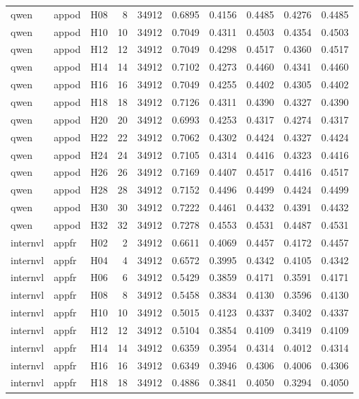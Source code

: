 \begin{table}[tbp]
\begin{tabular}{lllrrrrrrr}
qwen & appod & H08 & 8 & 34912 & 0.6895 & 0.4156 & 0.4485 & 0.4276 & 0.4485 \\
qwen & appod & H10 & 10 & 34912 & 0.7049 & 0.4311 & 0.4503 & 0.4354 & 0.4503 \\
qwen & appod & H12 & 12 & 34912 & 0.7049 & 0.4298 & 0.4517 & 0.4360 & 0.4517 \\
qwen & appod & H14 & 14 & 34912 & 0.7102 & 0.4273 & 0.4460 & 0.4341 & 0.4460 \\
qwen & appod & H16 & 16 & 34912 & 0.7049 & 0.4255 & 0.4402 & 0.4305 & 0.4402 \\
qwen & appod & H18 & 18 & 34912 & 0.7126 & 0.4311 & 0.4390 & 0.4327 & 0.4390 \\
qwen & appod & H20 & 20 & 34912 & 0.6993 & 0.4253 & 0.4317 & 0.4274 & 0.4317 \\
qwen & appod & H22 & 22 & 34912 & 0.7062 & 0.4302 & 0.4424 & 0.4327 & 0.4424 \\
qwen & appod & H24 & 24 & 34912 & 0.7105 & 0.4314 & 0.4416 & 0.4323 & 0.4416 \\
qwen & appod & H26 & 26 & 34912 & 0.7169 & 0.4407 & 0.4517 & 0.4416 & 0.4517 \\
qwen & appod & H28 & 28 & 34912 & 0.7152 & 0.4496 & 0.4499 & 0.4424 & 0.4499 \\
qwen & appod & H30 & 30 & 34912 & 0.7222 & 0.4461 & 0.4432 & 0.4391 & 0.4432 \\
qwen & appod & H32 & 32 & 34912 & 0.7278 & 0.4553 & 0.4531 & 0.4487 & 0.4531 \\
internvl & appfr & H02 & 2 & 34912 & 0.6611 & 0.4069 & 0.4457 & 0.4172 & 0.4457 \\
internvl & appfr & H04 & 4 & 34912 & 0.6572 & 0.3995 & 0.4342 & 0.4105 & 0.4342 \\
internvl & appfr & H06 & 6 & 34912 & 0.5429 & 0.3859 & 0.4171 & 0.3591 & 0.4171 \\
internvl & appfr & H08 & 8 & 34912 & 0.5458 & 0.3834 & 0.4130 & 0.3596 & 0.4130 \\
internvl & appfr & H10 & 10 & 34912 & 0.5015 & 0.4123 & 0.4337 & 0.3402 & 0.4337 \\
internvl & appfr & H12 & 12 & 34912 & 0.5104 & 0.3854 & 0.4109 & 0.3419 & 0.4109 \\
internvl & appfr & H14 & 14 & 34912 & 0.6359 & 0.3954 & 0.4314 & 0.4012 & 0.4314 \\
internvl & appfr & H16 & 16 & 34912 & 0.6349 & 0.3946 & 0.4306 & 0.4006 & 0.4306 \\
internvl & appfr & H18 & 18 & 34912 & 0.4886 & 0.3841 & 0.4050 & 0.3294 & 0.4050 \\

\end{tabular}
\end{table}
